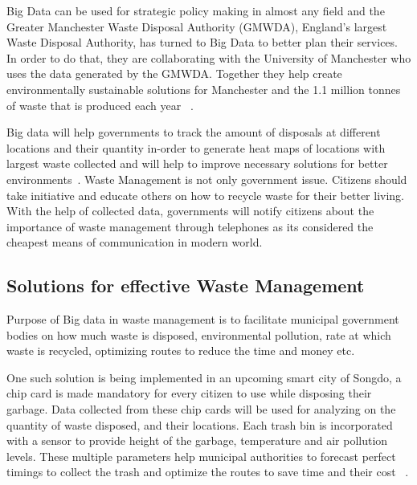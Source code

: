 \documentclass[sigconf]{acmart}
\begin{document}
Big Data can be used for strategic policy making in almost any field and the Greater Manchester Waste Disposal Authority (GMWDA), England’s largest Waste Disposal Authority, has turned to Big Data to better plan their services. In order to do that, they are collaborating with the University of Manchester who uses the data generated by the GMWDA. Together they help create environmentally sustainable solutions for Manchester and the 1.1 million tonnes of waste that is produced each year ~\cite{markvan2016}. 

Big data will help governments to track the amount of disposals at different locations and their quantity in-order to generate heat maps of locations with largest waste collected and will help to improve necessary solutions for better environments~\cite{markvan2016}. Waste Management is not only government issue. Citizens should take initiative and educate others on how to recycle waste for their better living. With the help of collected data, governments will notify citizens about the importance of waste management through telephones as its considered the cheapest means of communication in modern world.




\subsection{Solutions for effective Waste Management}

Purpose of Big data in waste management is to facilitate municipal government bodies on how much waste is disposed, environmental pollution, rate at which waste is recycled, optimizing routes to reduce the time and money etc.

One such solution is being implemented in an upcoming smart city of Songdo, a chip card is made mandatory for every citizen to use while disposing their garbage. Data collected from these chip cards will be used for analyzing on the quantity of waste disposed, and their locations. Each trash bin is incorporated with a sensor to provide height of the garbage, temperature and air pollution levels. These multiple parameters help municipal authorities to forecast perfect timings to collect the trash and optimize the routes to save time and their cost ~\cite{markvan2016}.
\end{document}
